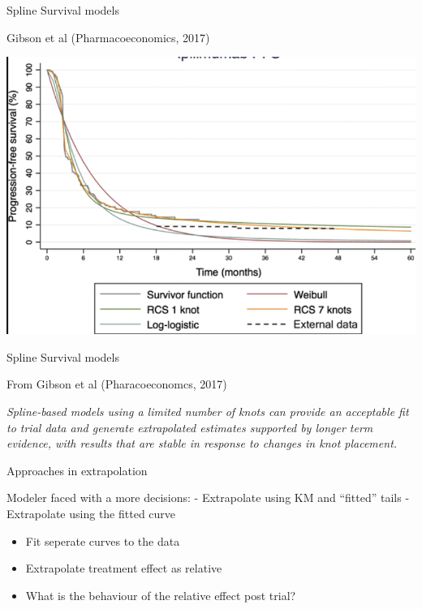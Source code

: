 \documentclass[
  ignorenonframetext,
]{beamer}
\providecommand{\tightlist}{%
  \setlength{\itemsep}{0pt}\setlength{\parskip}{0pt}}
\begin{document}
\begin{frame}{Spline Survival models}
\protect\hypertarget{spline-survival-models-1}{}

Gibson et al (Pharmacoeconomics, 2017)

\includegraphics[width=1\linewidth]{figures/flexsurv}

\end{frame}

\begin{frame}{Spline Survival models}
\protect\hypertarget{spline-survival-models-2}{}

From Gibson et al (Pharacoeconomcs, 2017)

\emph{Spline-based models using a limited number of knots can provide an
acceptable fit to trial data and generate extrapolated estimates
supported by longer term evidence, with results that are stable in
response to changes in knot placement.}

\end{frame}

\begin{frame}{Approaches in extrapolation}
\protect\hypertarget{approaches-in-extrapolation}{}

Modeler faced with a more decisions: - Extrapolate using KM and
``fitted'' tails - Extrapolate using the fitted curve

\begin{itemize}
\tightlist
\item
  Fit seperate curves to the data
\item
  Extrapolate treatment effect as relative
\item
  What is the behaviour of the relative effect post trial?
\end{itemize}

\end{frame}
\end{document}
